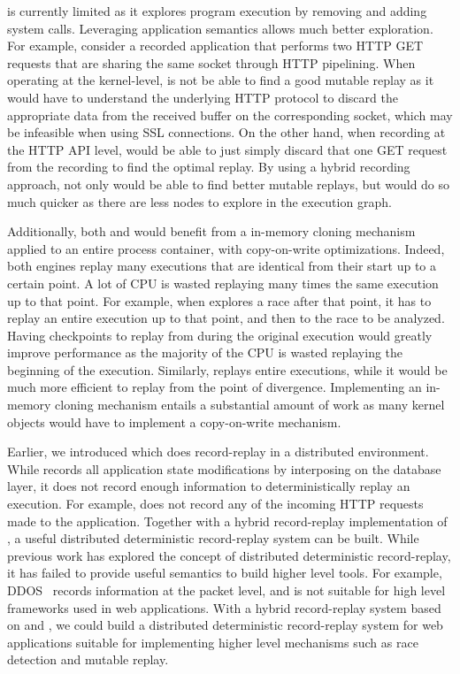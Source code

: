 \dora is currently limited as it explores program execution
by removing and adding system calls. Leveraging application semantics allows
much better exploration. For example, consider a recorded application that
performs two HTTP GET requests that are sharing the same socket through HTTP
pipelining. When operating at the kernel-level, \dora is not be able to
find a good mutable replay as it would have to understand the underlying HTTP
protocol to discard the appropriate data from the received buffer on the
corresponding socket, which may be infeasible when using SSL connections.
On the other hand, when recording at the HTTP API level, \dora would be able to
just simply discard that one GET request from the recording to find the optimal
replay. By using a hybrid recording approach, \dora not only would be able to
find better mutable replays, but would do so much quicker as there are
less nodes to explore in the execution graph.

Additionally, both \racepro and \dora would benefit from a in-memory cloning
mechanism applied to an entire process container, with copy-on-write optimizations.
Indeed, both engines replay many executions that are identical from their start
up to a certain point. A lot of CPU is wasted replaying many times the same
execution up to that point. For example, when \racepro explores a race after
that point, it has to replay an entire execution up to that point, and then to
the race to be analyzed. Having checkpoints to replay from during the original
execution would greatly improve performance as the majority of the CPU is wasted
replaying the beginning of the execution. Similarly, \dora replays entire
executions, while it would be much more efficient to replay from the point of
divergence. Implementing an in-memory cloning mechanism entails a substantial
amount of work as many kernel objects would have to implement a copy-on-write
mechanism.

Earlier, we introduced \synapse which does record-replay in a
distributed environment.
While \synapse records all application state modifications by
interposing on the database layer, it does not record enough
information to deterministically replay an execution. For example, \synapse does
not record any of the incoming HTTP requests made to the application.  Together
with a hybrid record-replay implementation of \scribe, a useful distributed
deterministic record-replay system can be built.  While previous work has
explored the concept of distributed deterministic record-replay, it has failed
to provide useful semantics to build higher level tools. For example,
DDOS~\cite{ddos} records information at the packet level, and is not suitable
for high level frameworks used in web applications.  With a hybrid record-replay
system based on \scribe and \synapse, we could build a distributed deterministic
record-replay system for web applications suitable for implementing higher level
mechanisms such as race detection and mutable replay.

